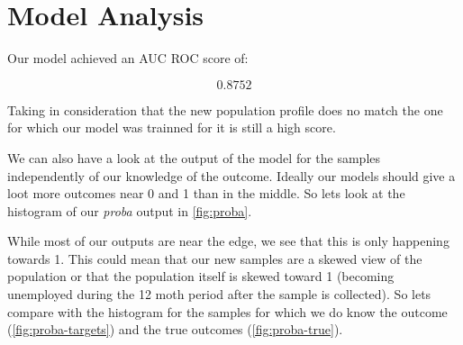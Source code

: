 \documentclass[a4paper]{article}
\begin{document}
    \section{Model Analysis}
    \label{sec:model}

    Our model achieved an AUC ROC score of:

    \[0.8752\]

    Taking in consideration that the new population profile does no match the
    one for which our model was trainned for it is still a high score.

    We can also have a look at the output of the model for the samples
    independently of our knowledge of the outcome.
    Ideally our models should give a loot more outcomes near 0 and 1 than
    in the middle.
    So lets look at the histogram of our \emph{proba} output in
    \vref{fig:proba}.


    While most of our outputs are near the edge, we see that this is only
    happening towards 1.
    This could mean that our new samples are a skewed view of the population
    or that the population itself is skewed toward 1 (becoming unemployed
    during the 12 moth period after the sample is collected).
    So lets compare with the histogram for the samples for which we do know
    the outcome (\vref{fig:proba-targets}) and the true outcomes
    (\vref{fig:proba-true}).
\end{document}
